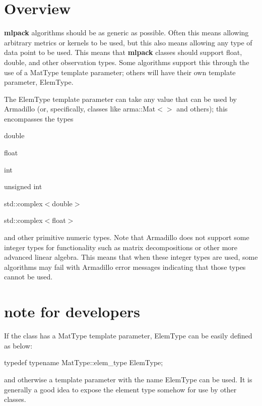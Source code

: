 \section{Overview}\label{elem_Overview}
{\bfseries mlpack} algorithms should be as generic as possible. Often this means allowing arbitrary metrics or kernels to be used, but this also means allowing any type of data point to be used. This means that {\bfseries mlpack} classes should support {\ttfamily float}, {\ttfamily double}, and other observation types. Some algorithms support this through the use of a {\ttfamily Mat\+Type} template parameter; others will have their own template parameter, {\ttfamily Elem\+Type}.

The {\ttfamily Elem\+Type} template parameter can take any value that can be used by Armadillo (or, specifically, classes like {\ttfamily arma\+::\+Mat$<$$>$} and others); this encompasses the types


\begin{DoxyItemize}
\item {\ttfamily double} 
\item {\ttfamily float} 
\item {\ttfamily int} 
\item {\ttfamily unsigned} int
\item {\ttfamily std\+::complex$<$double$>$} 
\item {\ttfamily std\+::complex$<$float$>$} 
\end{DoxyItemize}

and other primitive numeric types. Note that Armadillo does not support some integer types for functionality such as matrix decompositions or other more advanced linear algebra. This means that when these integer types are used, some algorithms may fail with Armadillo error messages indicating that those types cannot be used.\section{note for developers}\label{elem_A}
If the class has a {\ttfamily Mat\+Type} template parameter, {\ttfamily Elem\+Type} can be easily defined as below\+:


\begin{DoxyCode}
\textcolor{keyword}{typedef} \textcolor{keyword}{typename} MatType::elem\_type ElemType;
\end{DoxyCode}


and otherwise a template parameter with the name {\ttfamily Elem\+Type} can be used. It is generally a good idea to expose the element type somehow for use by other classes. 